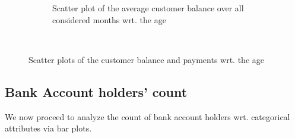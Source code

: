 \documentclass[a4paper]{article}
\begin{document}
\begin{enumerate}
\begin{figure}
\begin{subfigure}[b]{0.4\textwidth}
        \caption{Scatter plot of the average customer balance over all considered months wrt. the age}
        \label{fig:tiger}
    \end{subfigure}
    ~ %
    \caption{Scatter plots of the customer balance and payments wrt. the age}\label{fig:animals}
\end{figure}


\end{enumerate}


\subsection{Bank Account holders' count}

We now proceed to analyze the count of bank account holders wrt. categorical attributes via bar plots.
\end{document}
